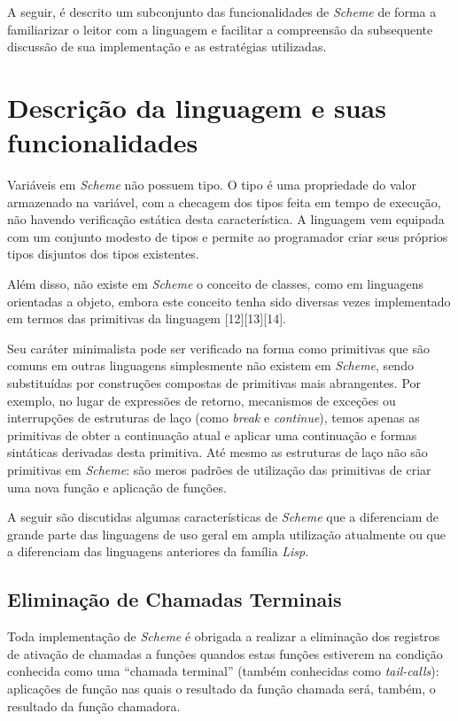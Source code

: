 A seguir, é descrito um subconjunto das funcionalidades de \textit{Scheme} de forma a
familiarizar o leitor com a linguagem e facilitar a compreensão da subsequente
discussão de sua implementação e as estratégias utilizadas.

\section{Descrição da linguagem e suas funcionalidades}
\label{sec:funcionalidades}

Variáveis em \textit{Scheme} não possuem tipo. O tipo é uma propriedade do
valor armazenado na variável, com a checagem dos tipos feita em tempo de
execução, não havendo verificação estática desta característica. A linguagem
vem equipada com um conjunto modesto de tipos e permite ao programador criar
seus próprios tipos disjuntos dos tipos existentes.

Além disso, não existe em \textit{Scheme} o conceito de classes, como em
linguagens orientadas a objeto, embora este conceito tenha sido diversas vezes
implementado em termos das primitivas da linguagem [12][13][14].

Seu caráter minimalista pode ser verificado na forma como primitivas que são
comuns em outras linguagens simplesmente não existem em \textit{Scheme}, sendo
substituídas por construções compostas de primitivas mais abrangentes.  Por
exemplo, no lugar de expressões de retorno, mecanismos de exceções ou
interrupções de estruturas de laço (como \textit{break} e \textit{continue}),
temos apenas as primitivas de obter a continuação atual e aplicar uma
continuação e formas sintáticas derivadas desta primitiva. Até mesmo as
estruturas de laço não são primitivas em \textit{Scheme}: são meros padrões de
utilização das primitivas de criar uma nova função e aplicação de funções.

A seguir são discutidas algumas características de \textit{Scheme} que a
diferenciam de grande parte das linguagens de uso geral em ampla utilização
atualmente ou que a diferenciam das linguagens anteriores da família
\textit{Lisp}.

\subsection{Eliminação de Chamadas Terminais}

Toda implementação de \textit{Scheme} é obrigada a realizar a eliminação dos
registros de ativação de chamadas a funções quandos estas funções estiverem 
na condição conhecida como uma ``chamada terminal'' (também conhecidas como 
\textit{tail-calls}): aplicações de função
nas quais o resultado da função chamada será, também, o resultado da função
chamadora.

